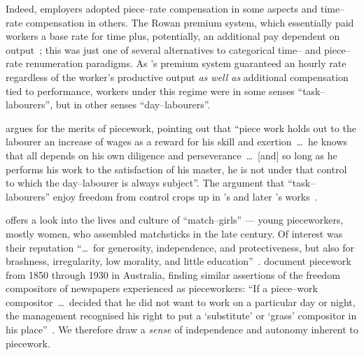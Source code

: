\documentclass[trackingWork]{subfiles}
\begin{document}
Indeed, employers adopted piece--rate compensation in some aspects and
time--rate compensation in others.
The Rowan premium system,
which essentially paid workers
a base rate for time plus, potentially,
an additional pay dependent on output~\cite{rowan1901premium};
this was just one of several alternatives to categorical time-- and piece--rate renumeration paradigms.
As \citeauthor{rowan1901premium}'s premium system guaranteed an hourly rate
regardless of the worker's productive output
\textit{as well as} additional compensation tied to performance,
workers under this regime were
in some senses ``task--labourers'', but
in other senses ``day--labourers''.

\citeauthor{hughRaynbirdTaskWork} argues for the merits of piecework, %
pointing out that
``piece work holds out to the labourer an increase of wages as a reward for his skill and exertion~\dots~he knows that all depends on his own diligence and perseverance~\dots~[and] so long as he performs his work to the satisfaction of his master, he is not under that control to which the day--labourer is always subject''.
The argument that ``task--labourers'' enjoy freedom from control crops up in \citeauthor{hughRaynbirdTaskWork}'s and later \citeauthor{rowan1901premium}'s works~\cite{hughRaynbirdTaskWork,rowan1901premium}.

\citeauthor{10.2307/3827491} offers a look into the lives and culture of ``match--girls''
--- young pieceworkers, mostly women, who assembled matchsticks in the late  century.
Of interest was their reputation ``\dots~for generosity, independence, and protectiveness,
but also for brashness, irregularity, low morality, and little education''~\cite{10.2307/3827491}.
\citeauthor{10.2307/27508091} document piecework from 1850 through 1930 in Australia,
finding similar assertions of the freedom compositors of newspapers experienced as pieceworkers:
``If a piece--work compositor~\dots~decided that he did not want to work on a particular day or night,
the management recognised his right to put a `substitute' or `grass' compositor in his place''~\cite{10.2307/27508091}.
We therefore draw a \textit{sense} of independence and autonomy inherent to piecework.
\end{document}
